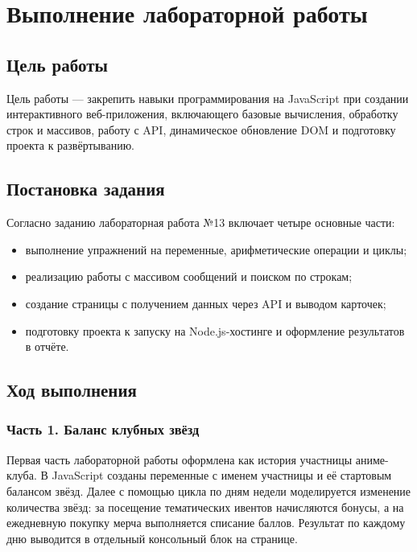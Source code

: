 \chapter{Выполнение лабораторной работы}
\label{ch:lab13}

\section{Цель работы}

Цель работы --- закрепить навыки программирования на JavaScript при создании интерактивного веб-приложения, включающего базовые вычисления, обработку строк и массивов, работу с API, динамическое обновление DOM и подготовку проекта к развёртыванию.

\section{Постановка задания}

Согласно заданию лабораторная работа №13 включает четыре основные части:
\begin{itemize}
    \item выполнение упражнений на переменные, арифметические операции и циклы;
    \item реализацию работы с массивом сообщений и поиском по строкам;
    \item создание страницы с получением данных через API и выводом карточек;
    \item подготовку проекта к запуску на Node.js-хостинге и оформление результатов в отчёте.
\end{itemize}

\section{Ход выполнения}

\subsection{Часть 1. Баланс клубных звёзд}

Первая часть лабораторной работы оформлена как история участницы аниме-клуба. В JavaScript созданы переменные с именем участницы и её стартовым балансом звёзд. Далее с помощью цикла по дням недели моделируется изменение количества звёзд: за посещение тематических ивентов начисляются бонусы, а на ежедневную покупку мерча выполняется списание баллов. Результат по каждому дню выводится в отдельный консольный блок на странице.

